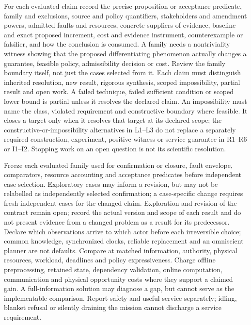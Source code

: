 \documentclass[11pt]{article}
\begin{document}
For each evaluated claim record the precise proposition or acceptance predicate, family and exclusions, source and policy quantifiers, stakeholders and amendment powers, admitted faults and resources, concrete suppliers of evidence, baseline and exact proposed increment, cost and evidence instrument, counterexample or falsifier, and how the conclusion is consumed. A family needs a nontriviality witness showing that the proposed differentiating phenomenon actually changes a guarantee, feasible policy, admissibility decision or cost. Review the family boundary itself, not just the cases selected from it. Each claim must distinguish inherited resolution, new result, rigorous synthesis, scoped impossibility, partial result and open work. A failed technique, failed sufficient condition or scoped lower bound is partial unless it resolves the declared claim. An impossibility must name the class, violated requirement and constructive boundary where feasible. It closes a target only when it resolves that target at its declared scope; the constructive-or-impossibility alternatives in L1--L3 do not replace a separately required construction, experiment, positive witness or service guarantee in R1--R6 or I1--I2. Stopping work on an open question is not its scientific resolution.

Freeze each evaluated family used for confirmation or closure, fault envelope, comparators, resource accounting and acceptance predicates before independent case selection. Exploratory cases may inform a revision, but may not be relabelled as independently selected confirmation; a case-specific change requires fresh independent cases for the changed claim. Exploration and revision of the contract remain open; record the actual version and scope of each result and do not present evidence from a changed problem as a result for its predecessor. Declare which observations arrive to which actor before each irreversible choice; common knowledge, synchronized clocks, reliable replacement and an omniscient planner are not defaults. Compare at matched information, authority, physical resources, workload, deadlines and policy expressiveness. Charge offline preprocessing, retained state, dependency validation, online computation, communication and physical opportunity costs where they support a claimed gain. A full-information solution may diagnose a gap, but cannot serve as the implementable comparison. Report safety and useful service separately; idling, blanket refusal or silently draining the mission cannot discharge a service requirement.
\end{document}
